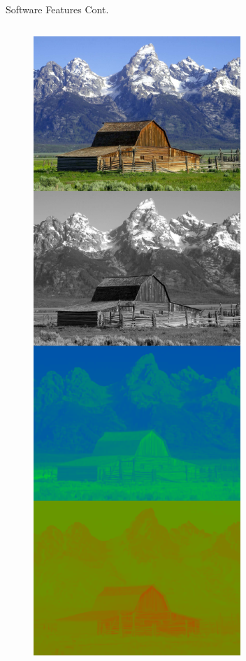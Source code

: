 \documentclass{beamer}
\begin{document}
\begin{frame}{Software Features Cont.}
  \begin{columns}
    \begin{figure}[H]
      \includegraphics[width=\textwidth]{Barn-yuv.png}

\end{figure}
\end{columns}
\end{frame}
\end{document}
